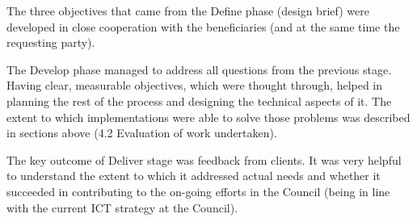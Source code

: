 The three objectives that came from the Define phase (design brief) were developed in close cooperation with the beneficiaries (and at the same time the requesting party).

The Develop phase managed to address all questions from the previous stage. Having clear, measurable objectives, which were thought through, helped in planning the rest of the process and designing the technical aspects of it. The extent to which implementations were able to solve those problems was described in sections above (4.2 Evaluation of work undertaken).

The key outcome of Deliver stage was feedback from clients. It was very helpful to understand the extent to which it addressed actual needs and whether it succeeded in contributing to the on-going efforts in the Council (being in line with the current ICT strategy at the Council).